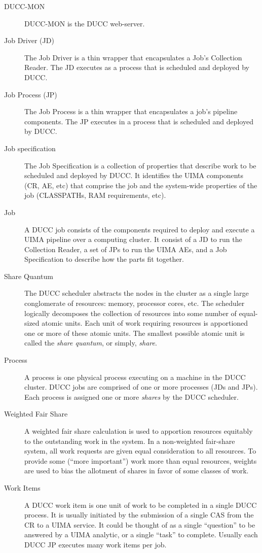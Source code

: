 \begin{description}
\item[DUCC-MON]  DUCC-MON is the DUCC web-server.

\item[Job Driver (JD)]The Job Driver is a thin wrapper that encapsulates a Job's Collection
  Reader. The JD executes as a process that is scheduled and deployed by DUCC.

\item[Job Process (JP)] The Job Process is a thin wrapper that encapsulates a job's pipeline
  components. The JP executes in a process that is scheduled and deployed by DUCC.

\item[Job specification] The Job Specification is a collection of properties that describe work to be
  scheduled and deployed by DUCC. It
  identifies the UIMA components (CR, AE, etc) that comprise the job and the system-wide
  properties of the job (CLASSPATHs, RAM requirements, etc). 

\item[Job] A DUCC job consists of the components required to deploy and execute a UIMA pipeline over
  a computing cluster. It consist of a JD to run the Collection Reader, a set of JPs to run the UIMA
  AEs, and a Job Specification to describe how the parts fit together.

\item[Share Quantum] The DUCC scheduler abstracts the nodes in the cluster as a single large
  conglomerate of resources: memory, processor cores, etc.  The scheduler logically decomposes 
  the collection of resources into some number of equal-sized atomic units.  Each unit of work requiring
  resources is apportioned one or more of these atomic units.  The smallest possible atomic 
  unit is called the {\em share quantum}, or simply, {\em share}.

\item[Process]A process is one physical process executing on a machine in the DUCC cluster. DUCC
  jobs are comprised of one or more processes (JDs and JPs).  Each process is assigned one or
  more {\em shares} by the DUCC scheduler.

\item[Weighted Fair Share] A weighted fair share calculation is used to apportion resources
  equitably to the outstanding work in the system.  In a non-weighted fair-share system, all
  work requests are given equal consideration to all resources.  To provide some (``more important'')
  work more than equal resources, weights are used to bias the allotment of shares in favor of
  some classes of work.

\item[Work Items] A DUCC work item is one unit of work to be completed in a single DUCC process. It
  is usually initiated by the submission of a single CAS from the CR to a UIMA service. It could be
  thought of as a single ``question'' to be answered by a UIMA analytic, or a single ``task'' to
  complete. Usually each DUCC JP executes many work items per job.
\end{description}


